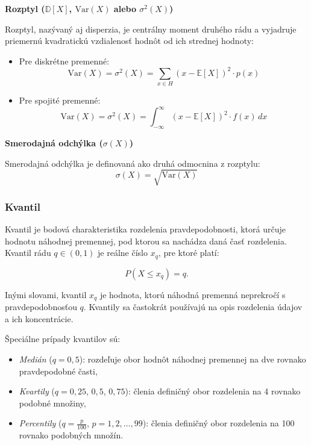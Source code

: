 \textbf{Rozptyl ($\mathbb{D}[X]$, $\mathrm{Var}(X)$ alebo $\sigma^2(X)$)}

Rozptyl, nazývaný aj disperzia, je centrálny moment druhého rádu a vyjadruje priemernú kvadratickú vzdialenosť hodnôt od ich strednej hodnoty:

\begin{itemize}
  \item Pre diskrétne premenné:
  \begin{equation}
    \mathrm{Var}(X) = \sigma^2(X) = \sum_{x \in H} (x - \mathbb{E}[X])^2 \cdot p(x)
  \end{equation}
  \item Pre spojité premenné:
  \begin{equation}
    \mathrm{Var}(X) = \sigma^2(X) = \int_{-\infty}^{\infty} (x - \mathbb{E}[X])^2 \cdot f(x) \, dx
  \end{equation}
\end{itemize}

\textbf{Smerodajná odchýlka ($\sigma(X)$)}

Smerodajná odchýlka je definovaná ako druhá odmocnina z rozptylu:
\begin{equation}
\sigma(X) = \sqrt{\mathrm{Var}(X)}
\end{equation}

\subsubsection{Kvantil}\label{subsubsection:kvantil}

Kvantil je bodová charakteristika rozdelenia pravdepodobnosti, ktorá určuje hodnotu náhodnej premennej, pod ktorou sa nachádza daná časť rozdelenia. Kvantil rádu $q \in (0,1)$ je reálne číslo $x_q$, pre ktoré platí:

\begin{equation}
P(X \leq x_q) = q.
\end{equation}

Inými slovami, kvantil $x_q$ je hodnota, ktorú náhodná premenná neprekročí s pravdepodobnosťou $q$. Kvantily sa častokrát používajú na opis rozdelenia údajov a ich koncentrácie.

Špeciálne prípady kvantilov sú:
\begin{itemize}
  \item \textit{Medián} ($q = 0{,}5$): rozdeľuje obor hodnôt náhodnej premennej na dve rovnako pravdepodobné časti,
  \item \textit{Kvartily} ($q = 0{,}25$, $0{,}5$, $0{,}75$): členia definičný obor rozdelenia na 4 rovnako podobné množiny,
  \item \textit{Percentily} ($q = \frac{p}{100}$, $p = 1, 2, \dots, 99$): členia definičný obor rozdelenia na 100 rovnako podobných množín.
\end{itemize}

